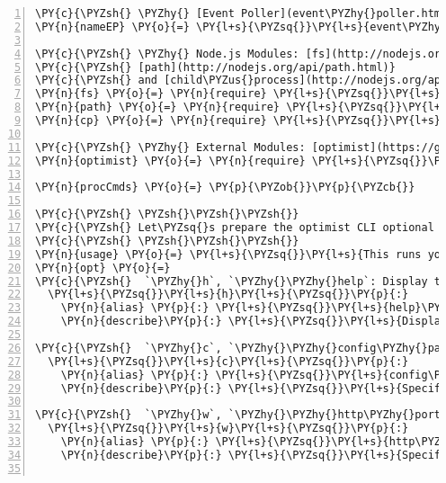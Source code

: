 \begin{Verbatim}[fontsize=\scriptsize,commandchars=\\\{\},numbers=left,firstnumber=1,stepnumber=1]
\PY{c}{\PYZsh{} \PYZhy{} [Event Poller](event\PYZhy{}poller.html) *(will be forked into a child process)*}
\PY{n}{nameEP} \PY{o}{=} \PY{l+s}{\PYZsq{}}\PY{l+s}{event\PYZhy{}poller}\PY{l+s}{\PYZsq{}}

\PY{c}{\PYZsh{} \PYZhy{} Node.js Modules: [fs](http://nodejs.org/api/fs.html),}
\PY{c}{\PYZsh{} [path](http://nodejs.org/api/path.html)}
\PY{c}{\PYZsh{} and [child\PYZus{}process](http://nodejs.org/api/child\PYZus{}process.html)}
\PY{n}{fs} \PY{o}{=} \PY{n}{require} \PY{l+s}{\PYZsq{}}\PY{l+s}{fs}\PY{l+s}{\PYZsq{}}
\PY{n}{path} \PY{o}{=} \PY{n}{require} \PY{l+s}{\PYZsq{}}\PY{l+s}{path}\PY{l+s}{\PYZsq{}}
\PY{n}{cp} \PY{o}{=} \PY{n}{require} \PY{l+s}{\PYZsq{}}\PY{l+s}{child\PYZus{}process}\PY{l+s}{\PYZsq{}}

\PY{c}{\PYZsh{} \PYZhy{} External Modules: [optimist](https://github.com/substack/node\PYZhy{}optimist)}
\PY{n}{optimist} \PY{o}{=} \PY{n}{require} \PY{l+s}{\PYZsq{}}\PY{l+s}{optimist}\PY{l+s}{\PYZsq{}}

\PY{n}{procCmds} \PY{o}{=} \PY{p}{\PYZob{}}\PY{p}{\PYZcb{}}

\PY{c}{\PYZsh{} \PYZsh{}\PYZsh{}\PYZsh{}}
\PY{c}{\PYZsh{} Let\PYZsq{}s prepare the optimist CLI optional arguments `[opt]`:}
\PY{c}{\PYZsh{} \PYZsh{}\PYZsh{}\PYZsh{}}
\PY{n}{usage} \PY{o}{=} \PY{l+s}{\PYZsq{}}\PY{l+s}{This runs your webapi\PYZhy{}based ECA engine}\PY{l+s}{\PYZsq{}}
\PY{n}{opt} \PY{o}{=}
\PY{c}{\PYZsh{}  `\PYZhy{}h`, `\PYZhy{}\PYZhy{}help`: Display the help}
  \PY{l+s}{\PYZsq{}}\PY{l+s}{h}\PY{l+s}{\PYZsq{}}\PY{p}{:}
    \PY{n}{alias} \PY{p}{:} \PY{l+s}{\PYZsq{}}\PY{l+s}{help}\PY{l+s}{\PYZsq{}}\PY{p}{,}
    \PY{n}{describe}\PY{p}{:} \PY{l+s}{\PYZsq{}}\PY{l+s}{Display this}\PY{l+s}{\PYZsq{}}

\PY{c}{\PYZsh{}  `\PYZhy{}c`, `\PYZhy{}\PYZhy{}config\PYZhy{}path`: Specify a path to a custom configuration file, other than \PYZdq{}config/config.json\PYZdq{}}
  \PY{l+s}{\PYZsq{}}\PY{l+s}{c}\PY{l+s}{\PYZsq{}}\PY{p}{:}
    \PY{n}{alias} \PY{p}{:} \PY{l+s}{\PYZsq{}}\PY{l+s}{config\PYZhy{}path}\PY{l+s}{\PYZsq{}}\PY{p}{,}
    \PY{n}{describe}\PY{p}{:} \PY{l+s}{\PYZsq{}}\PY{l+s}{Specify a path to a custom configuration file, other than }\PY{l+s}{\PYZdq{}}\PY{l+s}{config/config.json}\PY{l+s}{\PYZdq{}}\PY{l+s}{\PYZsq{}}

\PY{c}{\PYZsh{}  `\PYZhy{}w`, `\PYZhy{}\PYZhy{}http\PYZhy{}port`: Specify a HTTP port for the web server }
  \PY{l+s}{\PYZsq{}}\PY{l+s}{w}\PY{l+s}{\PYZsq{}}\PY{p}{:}
    \PY{n}{alias} \PY{p}{:} \PY{l+s}{\PYZsq{}}\PY{l+s}{http\PYZhy{}port}\PY{l+s}{\PYZsq{}}\PY{p}{,}
    \PY{n}{describe}\PY{p}{:} \PY{l+s}{\PYZsq{}}\PY{l+s}{Specify a HTTP port for the web server}\PY{l+s}{\PYZsq{}}


\end{Verbatim}
